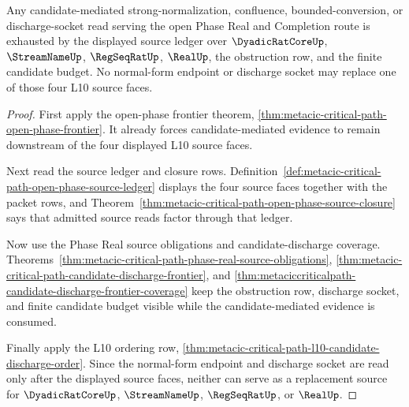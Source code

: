 \begin{theorem}
\label{thm:metacic-critical-path-frontier-source-exhaustion}
Any candidate-mediated strong-normalization, confluence, bounded-conversion, or discharge-socket read serving the open Phase Real and Completion route is exhausted by the displayed source ledger over $\DyadicRatCoreUp$, $\StreamNameUp$, $\RegSeqRatUp$, $\RealUp$, the obstruction row, and the finite candidate budget. No normal-form endpoint or discharge socket may replace one of those four L10 source faces.
\end{theorem}
\begin{proof}
First apply the open-phase frontier theorem, \autoref{thm:metacic-critical-path-open-phase-frontier}. It already forces candidate-mediated evidence to remain downstream of the four displayed L10 source faces.

Next read the source ledger and closure rows. Definition~\ref{def:metacic-critical-path-open-phase-source-ledger} displays the four source faces together with the packet rows, and Theorem~\ref{thm:metacic-critical-path-open-phase-source-closure} says that admitted source reads factor through that ledger.

Now use the Phase Real source obligations and candidate-discharge coverage. Theorems~\ref{thm:metacic-critical-path-phase-real-source-obligations}, \ref{thm:metacic-critical-path-candidate-discharge-frontier}, and \ref{thm:metaciccriticalpath-candidate-discharge-frontier-coverage} keep the obstruction row, discharge socket, and finite candidate budget visible while the candidate-mediated evidence is consumed.

Finally apply the L10 ordering row, \autoref{thm:metacic-critical-path-l10-candidate-discharge-order}. Since the normal-form endpoint and discharge socket are read only after the displayed source faces, neither can serve as a replacement source for $\DyadicRatCoreUp$, $\StreamNameUp$, $\RegSeqRatUp$, or $\RealUp$.
\end{proof}


